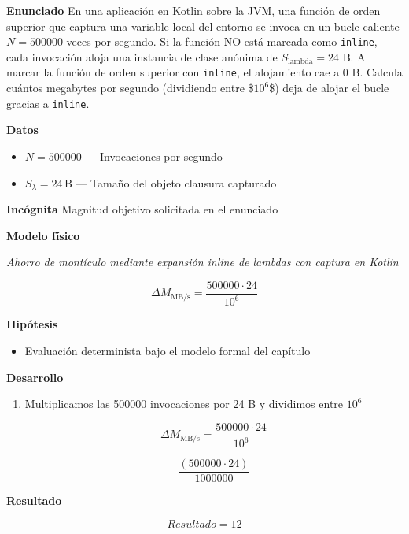 \documentclass{book}
\begin{document}
\begin{tcolorbox}[title={Problema resuelto}, studiumworked, breakable]

\noindent\textbf{Enunciado}
En una aplicación en Kotlin sobre la JVM, una función de orden superior que captura una variable local del entorno se invoca en un bucle caliente \(N = 500000\) veces por segundo. Si la función NO está marcada como \texttt{inline}, cada invocación aloja una instancia de clase anónima de \(S_{\text{lambda}} = 24\text{ B}\). Al marcar la función de orden superior con \texttt{inline}, el alojamiento cae a \(0\text{ B}\). Calcula cuántos megabytes por segundo (dividiendo entre \$\(10^6\)\$) deja de alojar el bucle gracias a \texttt{inline}.

\noindent\textbf{Datos}
\begin{itemize}
\item $N = 500000$ — Invocaciones por segundo
\item $S_{\lambda} = 24\,\mathrm{B}$ — Tamaño del objeto clausura capturado
\end{itemize}

\noindent\textbf{Incógnita}
Magnitud objetivo solicitada en el enunciado

\noindent\textbf{Modelo físico}

\noindent\textit{Ahorro de montículo mediante expansión inline de lambdas con captura en Kotlin}

\[
\Delta M_{\text{MB/s}} = \frac{500000 \cdot 24}{10^6}
\]

\noindent\textbf{Hipótesis}
\begin{itemize}
\item Evaluación determinista bajo el modelo formal del capítulo
\end{itemize}

\noindent\textbf{Desarrollo}
\begin{enumerate}
\item
Multiplicamos las 500000 invocaciones por 24 B y dividimos entre \(10^6\)

\[
\Delta M_{\text{MB/s}} = \frac{500000 \cdot 24}{10^6}
\]

\[
\frac{\left(500000\cdot 24\right)}{1000000}
\]
\end{enumerate}

\noindent\textbf{Resultado}

\[
Resultado = 12
\]


\end{tcolorbox}
\end{document}
